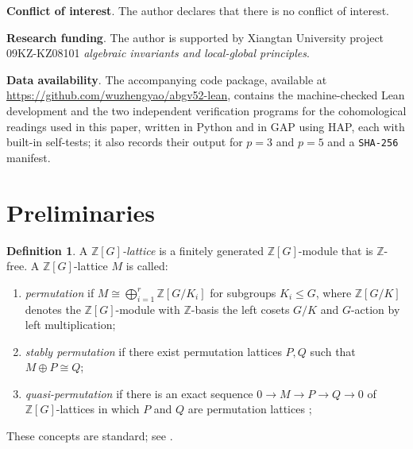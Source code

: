 \documentclass[12pt,a4paper]{article}
\theoremstyle{definition}
\newtheorem{definition}[theorem]{Definition}
\begin{document}
\medskip\noindent
\textbf{Conflict of interest}. 
The author declares that there is no conflict of interest. 

\medskip\noindent
\textbf{Research funding}. 
The author is supported by Xiangtan University project
09KZ-KZ08101 \textit{algebraic invariants and local-global principles}.

\medskip\noindent
\textbf{Data availability}. 
The accompanying code package, available at
\url{https://github.com/wuzhengyao/abgv52-lean}, contains the machine-checked
Lean development and the two independent verification programs for the
cohomological readings used in this paper, written in Python and in GAP using
HAP, each with built-in self-tests; it also records their output for \(p=3\)
and \(p=5\) and a \texttt{SHA-256} manifest.

\section{Preliminaries}

\begin{definition}\label{def:lattice}
A \emph{\(\mathbb{Z}[G]\)-lattice} is a finitely generated
\(\mathbb{Z}[G]\)-module that is \(\mathbb{Z}\)-free.
A \(\mathbb{Z}[G]\)-lattice \(M\) is called:
\begin{enumerate}
  \item \emph{permutation} if \(M \cong \bigoplus_{i=1}^r \mathbb{Z}[G/K_i]\)
    for subgroups \(K_i \le G\), where \(\mathbb{Z}[G/K]\) denotes the
    \(\mathbb{Z}[G]\)-module with \(\mathbb{Z}\)-basis the left cosets
    \(G/K\) and \(G\)-action by left multiplication;
  \item \emph{stably permutation} if there exist permutation lattices \(P, Q\)
    such that \(M \oplus P \cong Q\);
  \item \emph{quasi-permutation} if there is an exact sequence
    \(0 \to M \to P \to Q \to 0\) of \(\mathbb{Z}[G]\)-lattices in
    which \(P\) and \(Q\) are permutation lattices
    \cite[\S1]{EndoMiyata1973b};
\end{enumerate}
These concepts are standard; see \cite[\S1]{CTS77}.
\end{definition}
\end{document}
